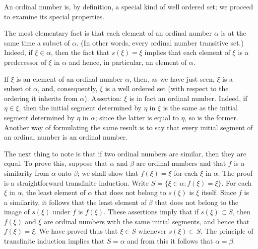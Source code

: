 
An ordinal number is, by definition, a special kind of well ordered set; we proceed to examine its special properties. 

The most elementary fact is that each element of an ordinal number $\alpha$ is at the same time a subset of $\alpha$. (In other words, every ordinal number transitive set.) Indeed, if $\xi \in \alpha$, then the fact that $s( \xi ) = \xi$ implies that each element of $\xi$ is a predecessor of $\xi$ in $\alpha$ and hence, in particular, an element of $\alpha$. 

If $\xi$ is an element of an ordinal number $\alpha$, then, as we have just seen, $\xi$ is a subset of $\alpha$, and, consequently, $\xi$ is a well ordered set (with respect to the ordering it inherits from $\alpha$). Assertion: $\xi$ is in fact an ordinal number. Indeed, if $\eta \in \xi$, then the initial segment determined by $\eta$ in $\xi$ is the same as the initial segment determined by $\eta$ in $\alpha$; since the latter is equal to $\eta$, so is the former. Another way of formulating the same result is to say that every initial segment of an ordinal number is an ordinal number. 

The next thing to note is that if two ordinal numbers are similar, then they are equal. To prove this, suppose that $\alpha$ and $\beta$ are ordinal numbers and that $f$ is a similarity from $\alpha$ onto $\beta$; we shall show that $f( \xi ) = \xi$ for each $\xi$ in $\alpha$. The proof is a straightforward transfinite induction. Write $S = \{ \xi \in \alpha : f( \xi ) = \xi \}$. For each $\xi$ in $\alpha$, the least element of $\alpha$ that does not belong to $s( \xi )$ is $\xi$ itself. Since $f$ is a similarity, it follows that the least element of $\beta$ that does not belong to the image of $s( \xi )$ under $f$ is $f( \xi )$. These assertions imply that if $s( \xi ) \subset S$, then $f(\xi )$ and $\xi$ are ordinal numbers with the same initial segments, and hence that $f(\xi ) = \xi$. We have proved thus that $\xi \in S$ whenever  $s( \xi ) \subset S$. The principle of transfinite induction implies that $S = \alpha$ and from this it follows that $\alpha = \beta$.

